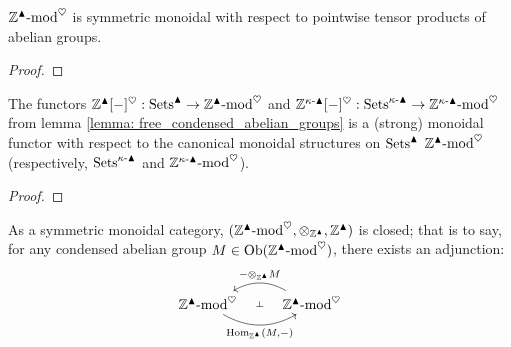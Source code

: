             \begin{lemma} \label{lemma: tensor_products_of_condensed_abelian_groups}
                $\mathbb{Z}^{\blacktriangle}\text{-}\mathrm{mod}^{\heartsuit}$ is symmetric monoidal with respect to pointwise tensor products of abelian groups.
            \end{lemma}
                \begin{proof}
                    
                \end{proof}
            \begin{proposition} \label{prop: forming_free_condensed_abelian_groups_is_monoidal}
                The functors $\mathbb{Z}^{\blacktriangle}[-]^{\heartsuit}: \mathrm{Sets}^{\blacktriangle} \to \mathbb{Z}^{\blacktriangle}\text{-}\mathrm{mod}^{\heartsuit}$ and $\mathbb{Z}^{\kappa\text{-}\blacktriangle}[-]^{\heartsuit}: \mathrm{Sets}^{\kappa\text{-}\blacktriangle} \to \mathbb{Z}^{\kappa\text{-}\blacktriangle}\text{-}\mathrm{mod}^{\heartsuit}$ from lemma \ref{lemma: free_condensed_abelian_groups} is a (strong) monoidal functor with respect to the canonical monoidal structures on $\mathrm{Sets}^{\blacktriangle}$ $\mathbb{Z}^{\blacktriangle}\text{-}\mathrm{mod}^{\heartsuit}$ (respectively, $\mathrm{Sets}^{\kappa\text{-}\blacktriangle}$ and $\mathbb{Z}^{\kappa\text{-}\blacktriangle}\text{-}\mathrm{mod}^{\heartsuit}$).
            \end{proposition}
                \begin{proof}
                    
                \end{proof}
            \begin{proposition} \label{lemma: the_category_of_condensed_abelian_groups_is_monoidally_closed}
                As a symmetric monoidal category, $(\Z^{\cond}\mod^{\heart}, \tensor_{\Z^{\cond}}, \Z^{\cond})$ is closed; that is to say, for any condensed abelian group $M \in \mathrm{Ob}(\mathbb{Z}^{\blacktriangle}\text{-}\mathrm{mod}^{\heartsuit})$, there exists an adjunction:
                    $$
                        \begin{tikzcd}
                        	{\Z^{\cond}\mod^{\heart}} & {\Z^{\cond}\mod^{\heart}}
                        	\arrow[""{name=0, anchor=center, inner sep=0}, "{\Hom_{\Z^{\cond}}(M, -)}"', bend right, from=1-1, to=1-2]
                        	\arrow[""{name=1, anchor=center, inner sep=0}, "{- \tensor_{\Z^{\cond}} M}"', bend right, from=1-2, to=1-1]
                        	\arrow["\dashv"{anchor=center, rotate=-90}, draw=none, from=1, to=0]
                        \end{tikzcd}
                    $$
            \end{proposition}
                
